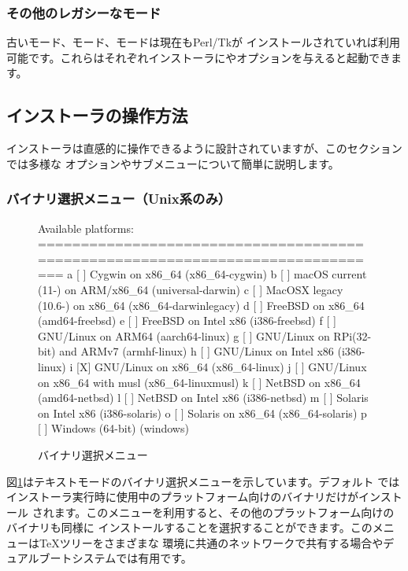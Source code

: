 \documentclass[uplatex,dvipdfmx,12pt,tombow]{jsarticle}
\begin{document}
\subsubsection{その他のレガシーなモード}

古いモード、モード、モードは現在もPerl/Tkが
インストールされていれば利用可能です。これらはそれぞれインストーラにやオプションを与えると起動できます。

\subsection{インストーラの操作方法}
\label{sec:runinstall}

インストーラは直感的に操作できるように設計されていますが、このセクションでは多様な
オプションやサブメニューについて簡単に説明します。

\subsubsection{バイナリ選択メニュー（Unix系のみ）}
\label{sec:binary}

\begin{figure}[tb]
\begin{boxedverbatim}
Available platforms:
===============================================================================
   a [ ] Cygwin on x86_64 (x86_64-cygwin)
   b [ ] macOS current (11-) on ARM/x86_64 (universal-darwin)
   c [ ] MacOSX legacy (10.6-) on x86_64 (x86_64-darwinlegacy)
   d [ ] FreeBSD on x86_64 (amd64-freebsd)
   e [ ] FreeBSD on Intel x86 (i386-freebsd)
   f [ ] GNU/Linux on ARM64 (aarch64-linux)
   g [ ] GNU/Linux on RPi(32-bit) and ARMv7 (armhf-linux)
   h [ ] GNU/Linux on Intel x86 (i386-linux)
   i [X] GNU/Linux on x86_64 (x86_64-linux)
   j [ ] GNU/Linux on x86_64 with musl (x86_64-linuxmusl)
   k [ ] NetBSD on x86_64 (amd64-netbsd)
   l [ ] NetBSD on Intel x86 (i386-netbsd)
   m [ ] Solaris on Intel x86 (i386-solaris)
   o [ ] Solaris on x86_64 (x86_64-solaris)
   p [ ] Windows (64-bit) (windows)
\end{boxedverbatim}
\vspace{-1zh}
\caption{バイナリ選択メニュー}\label{fig:bin-text}
\end{figure}

図\ref{fig:bin-text}はテキストモードのバイナリ選択メニューを示しています。デフォルト
ではインストーラ実行時に使用中のプラットフォーム向けのバイナリだけがインストール
されます。このメニューを利用すると、その他のプラットフォーム向けのバイナリも同様に
インストールすることを選択することができます。このメニューは\TeX ツリーをさまざまな
環境に共通のネットワークで共有する場合やデュアルブートシステムでは有用です。
\end{document}
